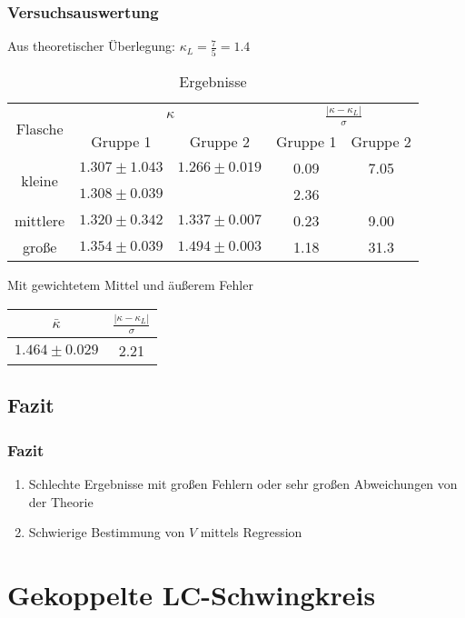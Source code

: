 \documentclass{beamer}
\begin{document}
\begin{frame}
\frametitle{Versuchsauswertung}

Aus theoretischer Überlegung: \hspace{0.2cm} $\kappa_L = \frac 75 = 1.4$

\begin{table}
\begin{tabular}{|c|c|c|c|c|}
\hline
\multirow{2}{*}{Flasche} & \multicolumn{2}{c|}{$\kappa$} & \multicolumn{2}{c|}{$\frac{|\kappa-\kappa_L|}\sigma$} \\
\cline{2-5}
& Gruppe 1 & Gruppe 2 & Gruppe 1 & Gruppe 2 \\
\hline
\multirow{2}{*}{kleine} & $1.307 \pm 1.043$ & $1.266 \pm 0.019$ & \cellcolor[rgb]{0.06,1,0} 0.09 & 
\cellcolor[rgb]{1,0,0} 7.05 \\
\cline{2-5}
& $1.308 \pm 0.039$ & & \cellcolor[rgb]{1,0.48,0} 2.36 & \\
\hline
mittlere & $1.320 \pm 0.342$ & $1.337 \pm 0.007$ & \cellcolor[rgb]{0.16,1,0} 0.23 & \cellcolor[rgb]{1,0,0} 9.00 \\
\hline
große & $1.354 \pm 0.039$ & $1.494 \pm 0.003$ & \cellcolor[rgb]{0.79,1,0} 1.18 & \cellcolor[rgb]{1,0,0} 31.3 \\
\hline
\end{tabular}
\caption{Ergebnisse}
\end{table}

Mit gewichtetem Mittel und äußerem Fehler
\begin{table}
\begin{tabular}{|c|c|}
\hline
$\bar\kappa$ & $\frac{|\kappa-\kappa_L|}\sigma$ \\
\hline
$1.464 \pm 0.029$ & 2.21 \\
\hline
\end{tabular}
\end{table}


\end{frame}



\subsection{Fazit}

\begin{frame}
\frametitle{Fazit}

\begin{enumerate}[-]
\item Schlechte Ergebnisse mit großen Fehlern oder sehr großen Abweichungen von der Theorie
\item Schwierige Bestimmung von $V$ mittels Regression
\end{enumerate}
\end{frame}

\section{Gekoppelte LC-Schwingkreis}
\end{document}
